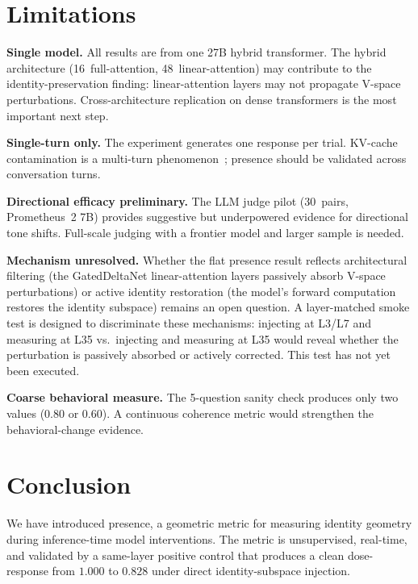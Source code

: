 \documentclass[11pt,a4paper]{article}
\begin{document}
\section{Limitations}
\label{sec:limitations}

\textbf{Single model.} All results are from one 27B hybrid transformer.
The hybrid architecture (16~full-attention, 48~linear-attention) may
contribute to the identity-preservation finding: linear-attention layers
may not propagate V-space perturbations. Cross-architecture replication on
dense transformers is the most important next step.

\textbf{Single-turn only.} The experiment generates one response per trial.
KV-cache contamination is a multi-turn
phenomenon~\citep{kang2026promptactivation}; presence should be validated
across conversation turns.

\textbf{Directional efficacy preliminary.} The LLM judge pilot (30~pairs,
Prometheus~2 7B) provides suggestive but underpowered evidence for
directional tone shifts. Full-scale judging with a frontier model and
larger sample is needed.

\textbf{Mechanism unresolved.}
Whether the flat presence result reflects architectural filtering (the
GatedDeltaNet linear-attention layers passively absorb V-space
perturbations) or active identity restoration (the model's forward
computation restores the identity subspace) remains an open question.
A layer-matched smoke test is designed to discriminate these mechanisms:
injecting at L3/L7 and measuring at L35 vs.\ injecting and measuring at
L35 would reveal whether the perturbation is passively absorbed or
actively corrected. This test has not yet been executed.

\textbf{Coarse behavioral measure.} The 5-question sanity check produces
only two values (0.80 or 0.60). A continuous coherence metric would
strengthen the behavioral-change evidence.

\section{Conclusion}
\label{sec:conclusion}

We have introduced presence, a geometric metric for measuring identity
geometry during inference-time model interventions. The metric is
unsupervised, real-time, and validated by a same-layer positive control
that produces a clean dose-response from $1.000$ to $0.828$ under direct
identity-subspace injection.
\end{document}
